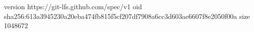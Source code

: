 version https://git-lfs.github.com/spec/v1
oid sha256:613a3945230a20eba474fb815f5cf207df7908a6cc3d603ae6607f8e2050f00a
size 1048672
